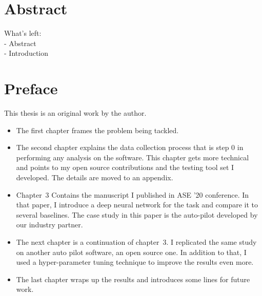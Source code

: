 
\chapter{Abstract}
What's left: \\
- Abstract \\
- Introduction \\

\chapter{Preface}

This thesis is an original work by the author. 
\begin{itemize}
    \item The first chapter frames the problem being tackled. 
    \item The second chapter explains the data collection process that is step 0 in performing any analysis on the software. This chapter gets more technical and points to my open source contributions and the testing tool set I developed.%
    The details are moved to an appendix.
    \item Chapter~3 Contains the manuscript I published in ASE '20 conference. In that paper, I introduce a deep neural network for the task and compare it to several baselines. The case study in this paper is the auto-pilot developed by our industry partner.
    \item The next chapter is a continuation of chapter~3. I replicated the same study on another auto pilot software, an open source one. In addition to that, I used a hyper-parameter tuning technique to improve the results even more.
    \item The last chapter wraps up the results and introduces some lines for future work.
\end{itemize}


\dedication{To the ones who made this a smoother journey.} 

\tableofcontents


\listoftables


\listoffigures

